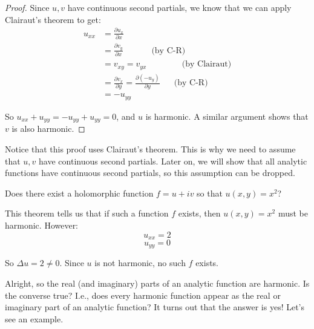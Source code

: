 \begin{proof} Since $u,v$ have continuous second partials, we know that we can apply Clairaut's theorem to get:
\begin{align*}u_{xx} &= \frac{\partial u_x}{\partial x}\\
& = \frac{\partial v_y}{\partial x} \hspace{40pt} \text{(by C-R)}\\
&= v_{xy} = v_{yx} \hspace{50pt} \text{(by Clairaut)}\\
&= \frac{\partial v_x}{\partial y} = \frac{\partial (-u_y)}{\partial y} \hspace{20pt} \text{(by C-R)}\\
&= -u_{yy}
\end{align*}

So $u_{xx} + u_{yy} = -u_{yy} + u_{yy} = 0$, and $u$ is harmonic. A similar argument shows that $v$ is also harmonic.
\end{proof}

Notice that this proof uses Clairaut's theorem. This is why we need to assume that $u,v$ have continuous second partials. Later on, we will show that all analytic functions have continuous second partials, so this assumption can be dropped.

\begin{ex}{}{} Does there exist a holomorphic function $f = u + iv$ so that $u(x,y) = x^2$?

This theorem tells us that if such a function $f$ exists, then $u(x,y) = x^2$ must be harmonic. However:
$$u_{xx} = 2$$
$$u_{yy} = 0$$

So $\Delta u = 2 \ne 0$. Since $u$ is not harmonic, no such $f$ exists.
\end{ex}

Alright, so the real (and imaginary) parts of an analytic function are harmonic. Is the converse true? I.e., does every harmonic function appear as the real or imaginary part of an analytic function? It turns out that the answer is yes! Let's see an example.

